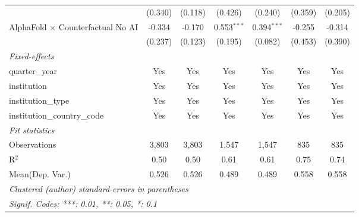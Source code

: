 \begin{tabular}{lcccccc}
                                            & (0.340)     & (0.118)       & (0.426)       & (0.240)       & (0.359)      & (0.205)\\   
   AlphaFold $\times$ Counterfactual No AI  & -0.334      & -0.170        & 0.553$^{***}$ & 0.394$^{***}$ & -0.255       & -0.314\\   
                                            & (0.237)     & (0.123)       & (0.195)       & (0.082)       & (0.453)      & (0.390)\\   
   \midrule
   \emph{Fixed-effects}\\
   quarter\_year                            & Yes         & Yes           & Yes           & Yes           & Yes          & Yes\\  
   institution                              & Yes         & Yes           & Yes           & Yes           & Yes          & Yes\\  
   institution\_type                        & Yes         & Yes           & Yes           & Yes           & Yes          & Yes\\  
   institution\_country\_code               & Yes         & Yes           & Yes           & Yes           & Yes          & Yes\\  
   \midrule
   \emph{Fit statistics}\\
   Observations                             & 3,803       & 3,803         & 1,547         & 1,547         & 835          & 835\\  
   R$^2$                                    & 0.50        & 0.50          & 0.61          & 0.61          & 0.75         & 0.74\\  
Mean(Dep. Var.) & 0.526 & 0.526 & 0.489 & 0.489 & 0.558 & 0.558 \\
   \midrule \midrule
   \multicolumn{7}{l}{\emph{Clustered (author) standard-errors in parentheses}}\\
   \multicolumn{7}{l}{\emph{Signif. Codes: ***: 0.01, **: 0.05, *: 0.1}}\\
\end{tabular}
\par\endgroup
